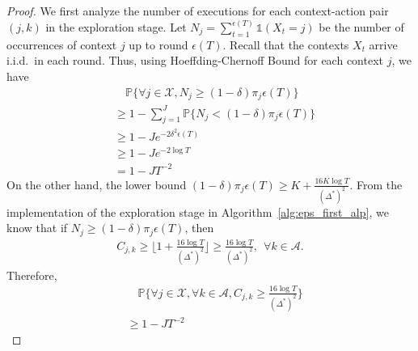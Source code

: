 \begin{proof}
We first analyze the number of executions for each context-action pair $(j,k)$ in the exploration stage.
Let $N_j = \sum_{t = 1}^{\epsilon(T)} \mathds{1}(X_t = j)$ be the number of occurrences of context $j$ up to round $\epsilon(T)$. Recall that the contexts $X_t$ arrive i.i.d.~in each round. Thus, using Hoeffding-Chernoff Bound for each context $j$, we have
\begin{align}
&\quad \mathbb{P}\bigg\{\forall j \in \mathcal{X}, N_j \geq (1-\delta) \pi_j \epsilon(T)\bigg\} \nonumber \\
& \geq 1 - \sum_{j = 1}^J \mathbb{P}\bigg\{N_j < (1-\delta) \pi_j \epsilon(T)\bigg\} \nonumber \\
& \geq 1 - J e^{-2\delta^2 \epsilon(T)} \nonumber \\
& \geq  1 - J e^{-2 \log T} \nonumber \\
& = 1 - J T^{-2}
\end{align}
On the other hand, the lower bound $(1-\delta) \pi_j \epsilon(T)\geq K + \frac{16K\log T}{(\Delta^*)^2}$. From the implementation of the exploration stage in Algorithm~\ref{alg:eps_first_alp}, we know that if $N_j \geq (1-\delta) \pi_j \epsilon(T)$, then
\begin{align}
C_{j,k} \geq \big\lfloor 1 + \frac{16\log T}{(\Delta^*)^2}\big\rfloor \geq \frac{16\log T}{(\Delta^*)^2},~~\forall k \in \mathcal{A}.
\end{align}
Therefore,
\begin{align}
&\quad \mathbb{P}\bigg\{\forall j \in \mathcal{X}, \forall k \in \mathcal{A}, C_{j,k} \geq  \frac{16\log T}{(\Delta^*)^2} \bigg\} \nonumber \\
& \geq 1 - J T^{-2}
\end{align}


\end{proof}
